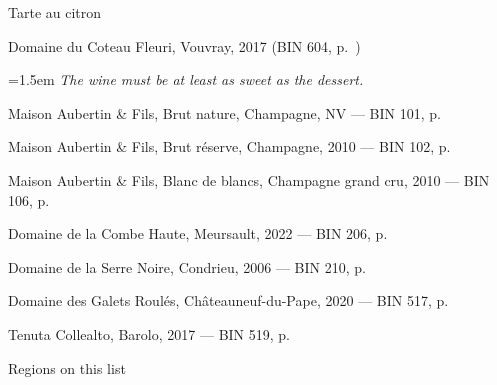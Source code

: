 \documentclass[10pt]{article}
\newcommand{\coeur}{{\color{accent}\faHeart}\ }
\begin{document}
\vspace{2.5mm}
{\large\color{rubrique} Tarte au citron}\par
\hspace*{1.5em}Domaine du Coteau Fleuri, Vouvray, 2017 {\footnotesize\color{doux}(BIN 604, p.~\pageref{l34bouteille})}\par
{\leftskip=1.5em\footnotesize\itshape\color{doux} The wine must be at least as sweet as the dessert.\par}
\vspace{2.5mm}
\vspace{6mm}\Needspace{6\baselineskip}{\centering\Large\color{rubrique} \coeur Our favourites\par}\vspace{3mm}
Maison Aubertin \& Fils, Brut nature, Champagne, NV {\footnotesize\color{doux}— BIN 101, p.~\pageref{l56bouteille}}\par\vspace{1mm}
Maison Aubertin \& Fils, Brut réserve, Champagne, 2010 {\footnotesize\color{doux}— BIN 102, p.~\pageref{l23bouteille}}\par\vspace{1mm}
Maison Aubertin \& Fils, Blanc de blancs, Champagne grand cru, 2010 {\footnotesize\color{doux}— BIN 106, p.~\pageref{l25bouteille}}\par\vspace{1mm}
Domaine de la Combe Haute, Meursault, 2022 {\footnotesize\color{doux}— BIN 206, p.~\pageref{l19bouteille}}\par\vspace{1mm}
Domaine de la Serre Noire, Condrieu, 2006 {\footnotesize\color{doux}— BIN 210, p.~\pageref{l32bouteille}}\par\vspace{1mm}
Domaine des Galets Roulés, Châteauneuf-du-Pape, 2020 {\footnotesize\color{doux}— BIN 517, p.~\pageref{l29bouteille}}\par\vspace{1mm}
Tenuta Collealto, Barolo, 2017 {\footnotesize\color{doux}— BIN 519, p.~\pageref{l46bouteille}}\par\vspace{1mm}
\clearpage
{\centering\Large\color{rubrique} Regions on this list\par}\vspace{6mm}
\end{document}
